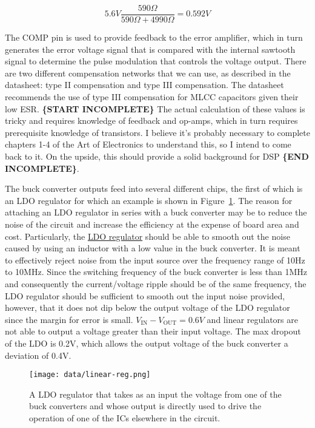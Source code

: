 \documentclass{default}
\begin{document}
\begin{equation}
  5.6V \frac{590\Omega}{590\Omega + 4990\Omega} = 0.592V \label{eq:fb-in}
\end{equation}

The COMP pin is used to provide feedback to the error amplifier, which in turn generates the error
voltage signal that is compared with the internal sawtooth signal to determine the pulse modulation
that controls the voltage output. There are two different compensation networks that we can use, as
described in the datasheet: type II compensation and type III compensation. The datasheet recommends
the use of type III compensation for MLCC capacitors given their low ESR. \textbf{\{START
  INCOMPLETE\}} The actual calculation of these values is tricky and requires knowledge of feedback
and op-amps, which in turn requires prerequisite knowledge of transistors. I believe it's probably
necessary to complete chapters 1-4 of the Art of Electronics to understand this, so I intend to come
back to it. On the upside, this should provide a solid background for DSP \textbf{\{END
  INCOMPLETE\}}.

The buck converter outputs feed into several different chips, the first of which is an LDO regulator
for which an example is shown in Figure~\ref{fig:linear-reg}. The reason for attaching an LDO
regulator in series with a buck converter may be to reduce the noise of the circuit and increase the
efficiency at the expense of board area and cost. Particularly, the
\href{http://www.ti.com/lit/ds/symlink/tps7a91.pdf}{LDO regulator} should be able to smooth out the
noise caused by using an inductor with a low value in the buck converter. It is meant to effectively
reject noise from the input source over the frequency range of 10Hz to 10MHz. Since the switching
frequency of the buck converter is less than 1MHz and consequently the current/voltage ripple should
be of the same frequency, the LDO regulator should be sufficient to smooth out the input noise
provided, however, that it does not dip below the output voltage of the LDO regulator since the
margin for error is small. $V_{\text{IN}}-V_{\text{OUT}}=0.6V$ and linear regulators are not able to
output a voltage greater than their input voltage. The max dropout of the LDO is 0.2V, which allows
the output voltage of the buck converter a deviation of 0.4V.

\begin{figure}[h]
  \centering
  \texttt{[image: data/linear-reg.png]}
  \caption{A LDO regulator that takes as an input the voltage from one of the buck converters and
    whose output is directly used to drive the operation of one of the ICs elsewhere in the
    circuit.}
  \label{fig:linear-reg}
\end{figure}
\end{document}
